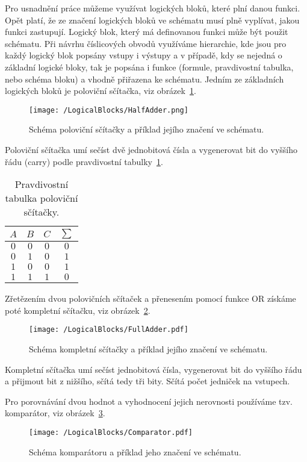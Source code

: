 \documentclass{report}
\begin{document}
Pro usnad\-nění práce můžeme využívat logických bloků, které plní danou funkci. Opět platí, že ze značení logických bloků ve schématu musí plně vyplívat, jakou funkci zastupují. Logický blok, který má definovanou funkci může být použit schématu. Při návrhu číslicových obvodů využíváme hierarchie, kde jsou pro každý logický blok popsány vstupy i výstupy a v případě, kdy se nejedná o základní logické bloky, tak je popsána i funkce (formule, pravdivostní tabulka, nebo schéma bloku) a vhodně přiřazena ke schématu. Jedním ze základních logických bloků je poloviční sčítačka, viz obrázek~\ref{fig:halfadder}.
\begin{figure}
\centering
\texttt{[image: /LogicalBlocks/HalfAdder.png]}
\caption{Schéma poloviční sčítačky a příklad jejího značení ve schématu.}
\label{fig:halfadder}
\end{figure}
 Poloviční sčítačka umí sečíst dvě jednobitová čísla a vygenerovat bit do vyššího řádu (carry) podle pravdivostní tabulky~\ref{tab:halfaddertab}.
\begin{table}
\centering
 \begin{tabular}{ |c c|c c| } 
   	\hline
	$A$ & $B$ & $C$ & $\sum$ \\
   	\hline
	$0$ & $0$ & $0$ & $0$ \\
	$0$ & $1$ & $0$ & $1$\\
	$1$ & $0$ & $0$ & $1$\\
	$1$ & $1$ & $1$ & $0$\\
   	\hline
\end{tabular}
	\caption{Pravdivostní tabulka poloviční sčítačky.}
	\label{tab:halfaddertab}
\end{table}
Zřetězením dvou polovičních sčítaček a přenesením pomocí funkce OR získáme poté kompletní sčítačku, viz obrázek~\ref{fig:fulladder}.\cite{kubatova}
\begin{figure}
\centering
\texttt{[image: /LogicalBlocks/FullAdder.pdf]}
\caption{Schéma kompletní sčítačky a příklad jejího značení ve schématu.}
\label{fig:fulladder}
\end{figure}
Kompletní sčítačka umí sečíst jednobitová čísla, vygenerovat bit do vyššího řádu a přijmout bit z nižšího, sčítá tedy tři bity. Sčítá počet jedniček na vstupech. \par
Pro porovnávání dvou hodnot a vyhodnocení jejich nerovnosti používáme tzv. komparátor, viz obrázek~\ref{fig:comparator}. 
\begin{figure}
\centering
\texttt{[image: /LogicalBlocks/Comparator.pdf]}
\caption{Schéma komparátoru a příklad jeho značení ve schématu.}
\label{fig:comparator}
\end{figure}
\end{document}
